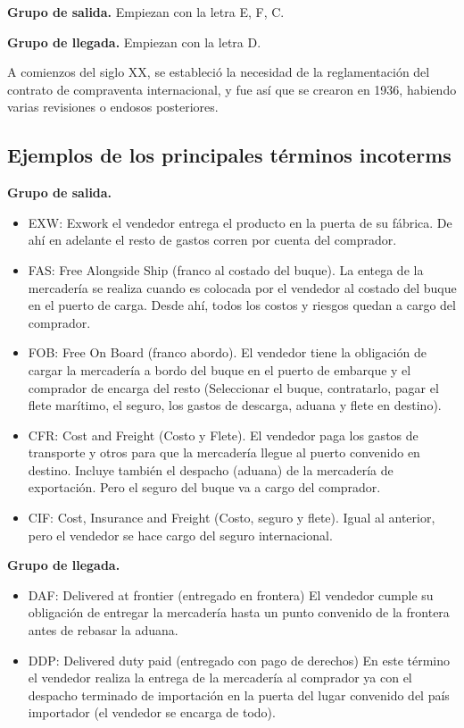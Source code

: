\textbf{Grupo de salida.}
Empiezan con la letra E, F, C.

\textbf{Grupo de llegada.}
Empiezan con la letra D.

A comienzos del siglo XX,
se estableció la necesidad de la reglamentación del contrato de compraventa 
internacional,
y fue así que se crearon en 1936,
habiendo varias revisiones o endosos posteriores.

\subsection{Ejemplos de los principales términos incoterms}

\textbf{Grupo de salida.}
\begin{itemize}
      \item EXW: Exwork el vendedor entrega el producto en la puerta de su fábrica. 
      De ahí en adelante el resto de gastos corren por cuenta del comprador.
      \item FAS: Free Alongside Ship (franco al costado del buque).
      La entega de la mercadería se realiza cuando es colocada por el vendedor 
      al costado del buque en el puerto de carga. Desde ahí, todos los costos 
      y riesgos quedan a cargo del comprador.
      \item FOB: Free On Board (franco abordo).
      El vendedor tiene la obligación de cargar la mercadería a bordo del buque 
      en el puerto de embarque y el comprador de encarga del resto 
      (Seleccionar el buque, contratarlo, pagar el flete marítimo,
      el seguro, los gastos de descarga, aduana y flete en destino).
      \item CFR: Cost and Freight (Costo y Flete).
      El vendedor paga los gastos de transporte y otros para que la mercadería 
      llegue al puerto convenido en destino. Incluye también el despacho 
      (aduana) de la mercadería de exportación. Pero el seguro del buque va a 
      cargo del comprador.
      \item CIF: Cost, Insurance and Freight (Costo, seguro y flete).
      Igual al anterior, pero el vendedor se hace cargo del seguro 
      internacional.
\end{itemize}

\textbf{Grupo de llegada.}
\begin{itemize}
      \item DAF: Delivered at frontier (entregado en frontera)
      El vendedor cumple su obligación de entregar la mercadería hasta un punto
      convenido de la frontera antes de rebasar la aduana.
      \item DDP: Delivered duty paid (entregado con pago de derechos)
      En este término el vendedor realiza la entrega de la mercadería al 
      comprador ya con el despacho terminado de importación en la puerta del 
      lugar convenido del país importador (el vendedor se encarga de todo).
\end{itemize}

